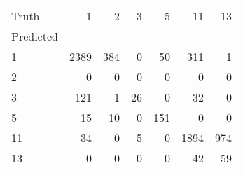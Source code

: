 \begin{tabular}{lrrrrrr}
\toprule
Truth & 1 & 2 & 3 & 5 & 11 & 13 \\
Predicted &  &  &  &  &  &  \\
\midrule
1 & 2389 & 384 & 0 & 50 & 311 & 1 \\
2 & 0 & 0 & 0 & 0 & 0 & 0 \\
3 & 121 & 1 & 26 & 0 & 32 & 0 \\
5 & 15 & 10 & 0 & 151 & 0 & 0 \\
11 & 34 & 0 & 5 & 0 & 1894 & 974 \\
13 & 0 & 0 & 0 & 0 & 42 & 59 \\
\bottomrule
\end{tabular}

